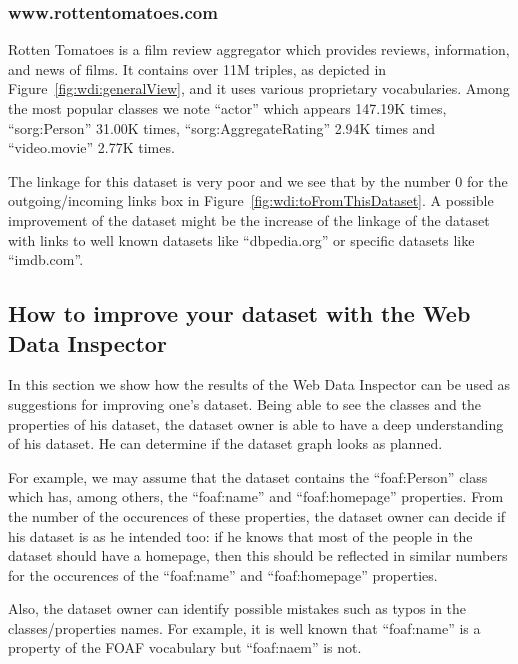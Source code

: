 \subsubsection{www.rottentomatoes.com}

Rotten Tomatoes is a film review aggregator which provides reviews, information, and news of films. It contains over 11M triples, as depicted in Figure~\ref{fig:wdi:generalView}, and it uses various proprietary vocabularies. Among the most popular classes we note ``actor'' which appears 147.19K times, ``sorg:Person'' 31.00K times, ``sorg:AggregateRating'' 2.94K times and ``video.movie'' 2.77K times.

The linkage for this dataset is very poor and we see that by the number 0 for the outgoing/incoming links box in Figure~\ref{fig:wdi:toFromThisDataset}. A possible improvement of the dataset might be the increase of the linkage of the dataset with links to well known datasets like ``dbpedia.org'' or specific datasets like ``imdb.com''.

\subsection{How to improve your dataset with the Web Data Inspector}

In this section we show how the results of the Web Data Inspector can be used as suggestions for improving one's dataset. Being able to see the classes and the properties of his dataset, the dataset owner is able to have a deep understanding of his dataset. He can determine if the dataset graph looks as planned.

For example, we may assume that the dataset contains the ``foaf:Person'' class which has, among others, the ``foaf:name'' and ``foaf:homepage'' properties. From the number of the occurences of these properties, the dataset owner can decide if his dataset is as he intended too: if he knows that most of the people in the dataset should have a homepage, then this should be reflected in similar numbers for the occurences of the ``foaf:name'' and ``foaf:homepage'' properties.

Also, the dataset owner can identify possible mistakes such as typos in the classes/properties names. For example, it is well known that ``foaf:name'' is a property of the FOAF vocabulary but ``foaf:naem'' is not.
